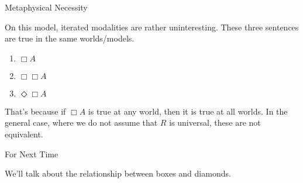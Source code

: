 \documentclass[
  ignorenonframetext,
]{beamer}
\providecommand{\tightlist}{%
  \setlength{\itemsep}{0pt}\setlength{\parskip}{0pt}}
\renewcommand{\,}{\text{, }}
\begin{document}
\begin{frame}{Metaphysical Necessity}
\protect\hypertarget{metaphysical-necessity}{}

On this model, iterated modalities are rather uninteresting. These three
sentences are true in the same worlds/models.

\begin{enumerate}
\tightlist
\item
  \(\Box A\)
\item
  \(\Box \Box A\)
\item
  \(\Diamond \Box A\)
\end{enumerate}

That's because if \(\Box A\) is true at any world, then it is true at
all worlds. In the general case, where we do not assume that \(R\) is
universal, these are not equivalent.

\end{frame}

\begin{frame}{For Next Time}
\protect\hypertarget{for-next-time}{}

We'll talk about the relationship between boxes and diamonds.

\end{frame}
\end{document}
